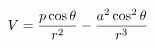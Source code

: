 \documentclass[preview]{standalone}
\begin{document}
\begin{align*}
V  =  {p\cos\theta  \over  r^2}  -  {a^2\cos^2\theta  \over  r^3}
\end{align*}
\end{document}
